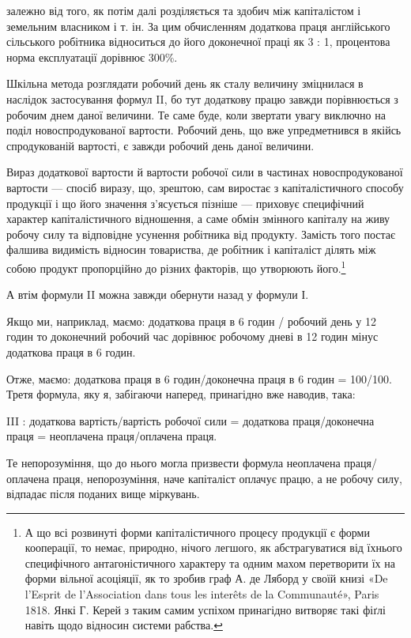 \parcont{}  %
залежно від того, як потім далі розділяється та здобич між капіталістом
і земельним власником і т. ін. За цим обчисленням
додаткова праця англійського сільського робітника відноситься
до його доконечної праці як 3 : 1, процентова норма експлуатації
дорівнює 300\%.

Шкільна метода розглядати робочий день як сталу величину
зміцнилася в наслідок застосування формул II, бо тут додаткову
працю завжди порівнюється з робочим днем даної величини.
Те саме буде, коли звертати увагу виключно на поділ новоспродукованої
вартости. Робочий день, що вже упредметнився в якійсь
спродукованій вартості, є завжди робочий день даної величини.

Вираз додаткової вартости й вартости робочої сили в частинах
новоспродукованої вартости — спосіб виразу, що, зрештою,
сам виростає з капіталістичного способу продукції і що його
значення з’ясується пізніше — приховує специфічний характер
капіталістичного відношення, а саме обмін змінного капіталу
на живу робочу силу та відповідне усунення робітника від продукту.
Замість того постає фалшива видимість відносин товариства,
де робітник і капіталіст ділять між собою продукт пропорційно
до різних факторів, що утворюють його.\footnote{
А що всі розвинуті форми капіталістичного процесу продукції
є форми кооперації, то немає, природно, нічого легшого, як абстрагуватися
від їхнього специфічного антагоністичного характеру та одним
махом перетворити їх на форми вільної асоціяції, як то зробив граф
А. де Ляборд у своїй книзі «De l’Esprit de l’Association dans tous les
interêts de la Communauté», Paris 1818. Янкі Г. Керей з таким самим
успіхом принагідно витворяє такі фіґлі навіть щодо відносин системи
рабства.
}

А втім формули II можна завжди обернути назад у формули І.

Якщо ми, наприклад, маємо: додаткова праця в 6 годин /
робочий день у 12 годин то доконечний
робочий час дорівнює робочому дневі в 12 годин мінус
додаткова праця в 6 годин.

Отже, маємо:
додаткова праця в 6 годин/доконечна праця в 6 годин = 100/100.
Третя формула, яку я, забігаючи наперед, принагідно вже
наводив, така:

III : додаткова вартість/вартість робочої сили =
додаткова праця/доконечна праця =
неоплачена праця/оплачена праця.

Те непорозуміння, що до нього могла призвести формула
неоплачена праця/оплачена праця, непорозуміння, наче капіталіст оплачує працю,
а не робочу силу, відпадає після поданих вище міркувань.
\parbreak{}  %
